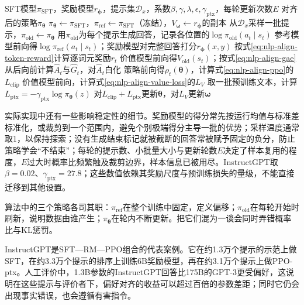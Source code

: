 \begin{algorithm}[RLHF中的PPO训练循环]
  \label{alg:nlp-align-rlhf-ppo}
  \begin{algorithmic}[1]
    \Require SFT模型$\pi_{\mathrm{SFT}}$，奖励模型$r_{\bm\phi}$，提示集$\mathcal D_x$，系数$\beta,\gamma,\lambda,\epsilon,\gamma_{\mathrm{ptx}}$，每轮更新次数$E$
    \Ensure 对齐后的策略$\pi_{\bm\theta}$
    \State $\pi_{\bm\theta}\gets\pi_{\mathrm{SFT}}$，$\pi_{\mathrm{ref}}\gets\pi_{\mathrm{SFT}}$（冻结），$V_{\bm\omega}\gets r_{\bm\phi}$的副本
      \State 从$\mathcal D_x$采样一批提示，$\pi_{\mathrm{old}}\gets\pi_{\bm\theta}$
      \State 用$\pi_{\mathrm{old}}$为每个提示生成回答，记录各位置的$\log\pi_{\mathrm{old}}(a_t\mid s_t)$
      \State 参考模型前向得$\log\pi_{\mathrm{ref}}(a_t\mid s_t)$；奖励模型对完整回答打分$r_{\bm\phi}(x,y)$
      \State 按式\eqref{eq:nlp-align-token-reward}计算逐词元奖励$r_t$
      \State 价值模型前向得$V_{\mathrm{old}}(s_t)$；按式\eqref{eq:nlp-align-gae}从后向前计算$\widehat A_t$与$\widehat G_t$，对$\widehat A_t$白化
          \State 策略前向得$\rho_t(\bm\theta)$，计算式\eqref{eq:nlp-align-ppo}的$L_{\mathrm{clip}}$
          \State 价值模型前向，计算式\eqref{eq:nlp-align-value-loss}的$L_V$
          \State 取一批预训练文本，计算$L_{\mathrm{ptx}}=-\gamma_{\mathrm{ptx}}\log\pi_{\bm\theta}(z)$
          \State 对$L_{\mathrm{clip}}+L_{\mathrm{ptx}}$更新$\bm\theta$，对$L_V$更新$\bm\omega$
        \EndFor
      \EndFor
    \EndFor
  \end{algorithmic}
\end{algorithm}

实际实现中还有一些影响稳定性的细节。奖励模型的得分常先按运行均值与标准差标准化，或裁剪到一个范围内，避免个别极端得分主导一批的优势；采样温度通常取1，以保持探索；没有生成结束标记就被截断的回答常被赋予固定的负分，防止策略学会“不结束”；每轮的提示数、小批量大小与更新轮数$E$决定了样本复用的程度，$E$过大时概率比频繁触及裁剪边界，样本信息已被用尽。InstructGPT取$\beta=0.02$、$\gamma_{\mathrm{ptx}}=27.8$\cite{ouyang2022instructgpt}；这些数值依赖其奖励尺度与预训练损失的量级，不能直接迁移到其他设置。

算法中的三个策略各司其职：$\pi_{\mathrm{ref}}$在整个训练中固定，定义偏移；$\pi_{\mathrm{old}}$在每轮开始时刷新，说明数据由谁产生；$\pi_{\bm\theta}$在轮内不断更新。把它们混为一谈会同时弄错概率比与KL惩罚。

InstructGPT是SFT—RM—PPO组合的代表案例。它在约1.3万个提示的示范上做SFT，在约3.3万个提示的排序上训练6B奖励模型，再在约3.1万个提示上做PPO-ptx。人工评价中，1.3B参数的InstructGPT回答比175B的GPT-3更受偏好，这说明在这些提示与评价者下，偏好对齐的收益可以超过百倍的参数差距；同时它仍会出现事实错误，也会遵循有害指令。

